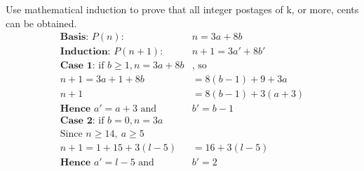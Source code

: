 \documentclass[landscape, letterpaper, 8pt]{extarticle}
\begin{document}
\begin{multicols}{2}
\begin{example}
        Use mathematical induction to prove that all integer postages of k, or more, cents can be
        obtained.
        \begin{equation*}
            \begin{aligned}
                \textbf{Basis: } P(n):                             & n = 3a + 8b       \\
                \textbf{Induction: } P(n+1):                       & n+1 = 3a' + 8b'   \\
                \textbf{Case 1: } \text{if } b \geq 1, n = 3a + 8b & \text{, so}       \\
                n+1 = 3a+1+8b                                      & = 8(b-1) + 9 + 3a \\
                n+1                                                & = 8(b-1) +3(a+3)  \\
                \textbf{Hence }a' = a+3      \text{ and }          & b' = b - 1        \\
                \textbf{Case 2: } \text{if } b = 0, n = 3a         &                   \\
                \text{Since }n \geq 14,~a \geq 5                                       \\
                n+1 = 1 + 15 + 3(l-5)                              & = 16+ 3(l-5)      \\
                \textbf{Hence }a' = l-5      \text{ and }          & b' = 2            \\
            \end{aligned}
        \end{equation*}
    \end{example}

\end{multicols}
\end{document}
